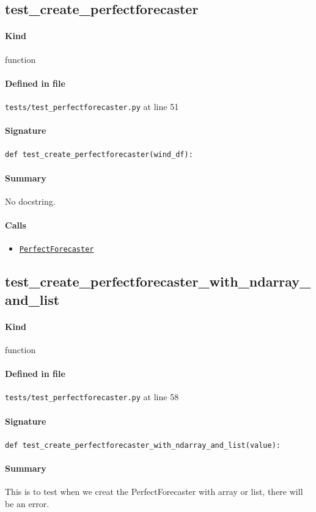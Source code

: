 \documentclass[11pt]{report}
\begin{document}
\subsection{test\_create\_perfectforecaster}
\label{def:tests-test_perfectforecaster.py:test_create_perfectforecaster:L51}
\paragraph{Kind} function
\paragraph{Defined in file} \texttt{tests/test\_perfectforecaster.py} at line 51
\paragraph{Signature} \texttt{def test\_create\_perfectforecaster(wind\_df):}
\paragraph{Summary} No docstring.
\paragraph{Calls}
\begin{itemize}[leftmargin=*]
  \item \hyperref[def:forecaster.py:PerfectForecaster:L686]{\texttt{PerfectForecaster}}
\end{itemize}
\subsection{test\_create\_perfectforecaster\_with\_ndarray\_and\_list}
\label{def:tests-test_perfectforecaster.py:test_create_perfectforecaster_with_ndarray_and_list:L58}
\paragraph{Kind} function
\paragraph{Defined in file} \texttt{tests/test\_perfectforecaster.py} at line 58
\paragraph{Signature} \texttt{def test\_create\_perfectforecaster\_with\_ndarray\_and\_list(value):}
\paragraph{Summary} This is to test when we creat the PerfectForecaster with array or list, there will be an error.
\end{document}
